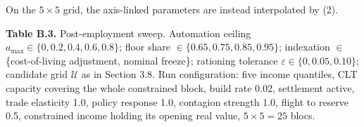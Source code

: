 \documentclass[preprint,review,12pt]{elsarticle}
\begin{document}
On the \(5 \times 5\) grid, the axis-linked parameters are instead
interpolated by (2).

\textbf{Table B.3.} Post-employment sweep. Automation ceiling
\(a_{\max} \in \{0, 0.2, 0.4, 0.6, 0.8\}\); floor share
\(\in \{0.65, 0.75, 0.85, 0.95\}\); indexation \(\in\) \{cost-of-living
adjustment, nominal freeze\}; rationing tolerance
\(\varepsilon \in \{0, 0.05, 0.10\}\); candidate grid \(\mathcal{U}\) as
in Section 3.8. Run configuration: five income quantiles, CLT capacity
covering the whole constrained block, build rate 0.02, settlement
active, trade elasticity 1.0, policy response 1.0, contagion strength
1.0, flight to reserve 0.5, constrained income holding its opening real
value, \(5 \times 5 = 25\) blocs.
\end{document}
